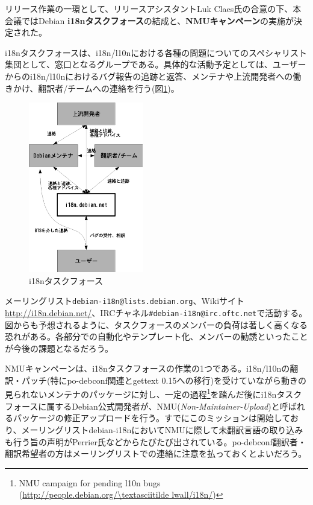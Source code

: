 \documentclass[mingoth,a4paper]{jsarticle}
\begin{document}
リリース作業の一環として、リリースアシスタントLuk Claes氏の合意の下、本会議ではDebian \textbf{i18nタスクフォース}の結成と、\textbf{NMUキャンペーン}の実施が決定された。

i18nタスクフォースは、i18n/l10nにおける各種の問題についてのスペシャリスト集団として、窓口となるグループである。具体的な活動予定としては、ユーザーからのi18n/l10nにおけるバグ報告の追跡と返答、メンテナや上流開発者への働きかけ、翻訳者/チームへの連絡を行う(図\ref{fig:i18ntaskforce})。

\begin{figure}[h]
  \begin{center}
    \includegraphics[width=5cm]{image200610/i18ntaskforce.eps}
  \end{center}
  \caption{i18nタスクフォース}
  \label{fig:i18ntaskforce}
\end{figure}

メーリングリスト\texttt{debian-i18n@lists.debian.org}、Wikiサイト\url{http://i18n.debian.net/}、IRCチャネル\texttt{\#debian-i18n@irc.oftc.net}で活動する。図からも予想されるように、タスクフォースのメンバーの負荷は著しく高くなる恐れがある。各部分での自動化やテンプレート化、メンバーの勧誘といったことが今後の課題となるだろう。

NMUキャンペーンは、i18nタスクフォースの作業の1つである。i18n/l10nの翻訳・パッチ(特にpo-debconf関連とgettext 0.15への移行)を受けていながら動きの見られないメンテナのパッケージに対し、一定の過程\footnote{NMU campaign for pending l10n bugs (\url{http://people.debian.org/\textasciitilde lwall/i18n/})}を踏んだ後にi18nタスクフォースに属するDebian公式開発者が、NMU(\emph{Non-Maintainer-Upload})と呼ばれるパッケージの修正アップロードを行う。すでにこのミッションは開始しており、メーリングリストdebian-i18nにおいてNMUに際して未翻訳言語の取り込みも行う旨の声明がPerrier氏などからたびたび出されている。po-debconf翻訳者・翻訳希望者の方はメーリングリストでの連絡に注意を払っておくとよいだろう。
\end{document}
